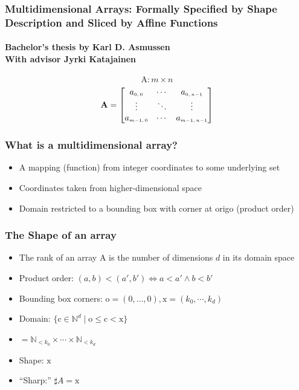 \documentclass[xetex,mathserif,serif]{beamer}
\newcommand\mrm[1]{\mathrm{#1}}
\newcommand\brm[1]{\bm{\mrm{#1}}}
\newcommand\Nat{\mathbb{N}}
\begin{document}
\begin{frame}
  \frametitle{Multidimensional Arrays: Formally Specified by Shape Description and Sliced by Affine Functions}
  \framesubtitle{Bachelor's thesis by Karl D. Asmussen \\
  With advisor Jyrki Katajainen}
  
  \[
    \bm{\mathrm{A}} : m \times n
  \]
  \[ \bm{\mathrm{A}}=
      \begin{bmatrix}
        a_{\text{\tiny$0,0$}} & \cdots & a_{\text{\tiny$0,n{-}1$}} \\
        \vdots & \ddots & \vdots \\
        a_{\text{\tiny$m{-}1,0$}} & \cdots & a_{\text{\tiny$m{-}1,n{-}1$}}
      \end{bmatrix}
  \]
\end{frame}

\begin{frame}
  \frametitle{What is a multidimensional array?}
  \begin{itemize}%
    \item A mapping (function) from integer coordinates to some underlying set
    \item Coordinates taken from higher-dimensional space
    \item Domain restricted to a bounding box with corner at origo (product order)
  \end{itemize}
\end{frame}

\begin{frame}
  \frametitle{The Shape of an array}
  \begin{itemize}%
    \item The rank of an array $\brm A$ is the number of dimensions $d$ in its domain space
    \item Product order: $(a, b) < (a', b') \iff a < a' \land b < b'$
    \item Bounding box corners: $\brm o = (0, \dots, 0), \brm x = (k_0, \cdots, k_d)$
    \item Domain: $\{\brm c \in \Nat^d \mid \brm o \le \brm c < \brm x\}$
    \item $= \Nat_{<k_0} \times \cdots \times \Nat_{<k_d}$
    \item Shape: $\brm x$
    \item ``Sharp:'' $\sharp A = \brm x$
  \end{itemize}
\end{frame}
\end{document}
